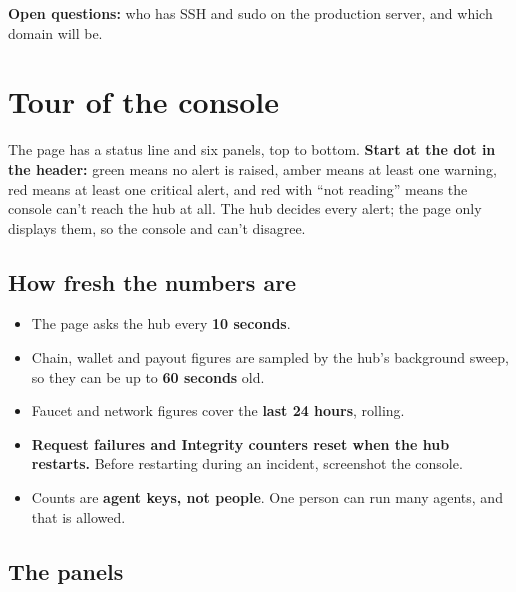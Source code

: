 \documentclass[11pt]{article}
\begin{document}
\textbf{Open questions:} who has SSH and sudo on the production server, and which domain  will be.

\section{Tour of the console}

The page has a status line and six panels, top to bottom. \textbf{Start at the dot in the header:} green means no alert is raised, amber means at least one warning, red means at least one critical alert, and red with ``not reading'' means the console can't reach the hub at all. The hub decides every alert; the page only displays them, so the console and  can't disagree.

\subsection{How fresh the numbers are}

\begin{itemize}[leftmargin=1.5em]
  \item The page asks the hub every \textbf{10 seconds}.
  \item Chain, wallet and payout figures are sampled by the hub's background sweep, so they can be up to \textbf{60 seconds} old.
  \item Faucet and network figures cover the \textbf{last 24 hours}, rolling.
  \item \textbf{Request failures and Integrity counters reset when the hub restarts.} Before restarting during an incident, screenshot the console.
  \item Counts are \textbf{agent keys, not people}. One person can run many agents, and that is allowed.
\end{itemize}

\subsection{The panels}
\end{document}
